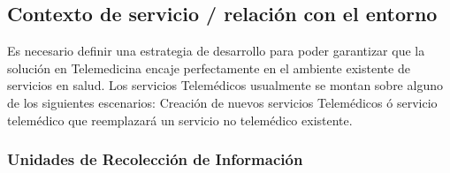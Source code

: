 \subsection{ Contexto de servicio / relación con el entorno}

Es necesario definir una estrategia de desarrollo para poder garantizar que la solución en Telemedicina encaje perfectamente en el ambiente existente de servicios en salud. Los servicios Telemédicos usualmente se montan sobre alguno de los siguientes escenarios: Creación de nuevos servicios Telemédicos ó servicio telemédico que reemplazará un servicio no telemédico existente.

\subsubsection{Unidades de Recolección de Información}

